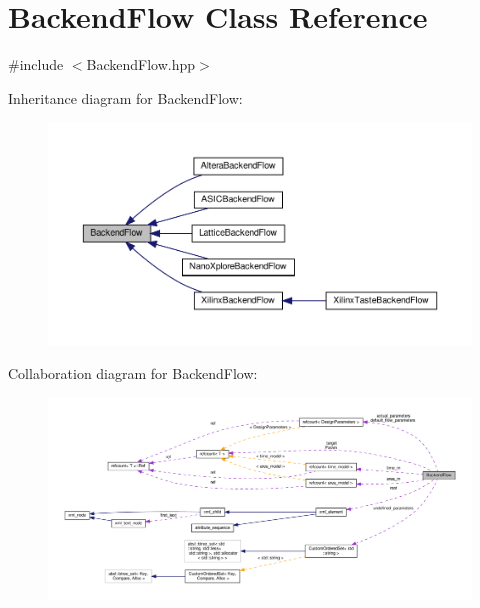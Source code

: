 \hypertarget{classBackendFlow}{}\section{Backend\+Flow Class Reference}
\label{classBackendFlow}


{\ttfamily \#include $<$Backend\+Flow.\+hpp$>$}



Inheritance diagram for Backend\+Flow\+:
\nopagebreak
\begin{figure}[H]
\begin{center}
\leavevmode
\includegraphics[width=350pt]{dd/d71/classBackendFlow__inherit__graph}
\end{center}
\end{figure}


Collaboration diagram for Backend\+Flow\+:
\nopagebreak
\begin{figure}[H]
\begin{center}
\leavevmode
\includegraphics[width=350pt]{df/d3e/classBackendFlow__coll__graph}
\end{center}
\end{figure}
